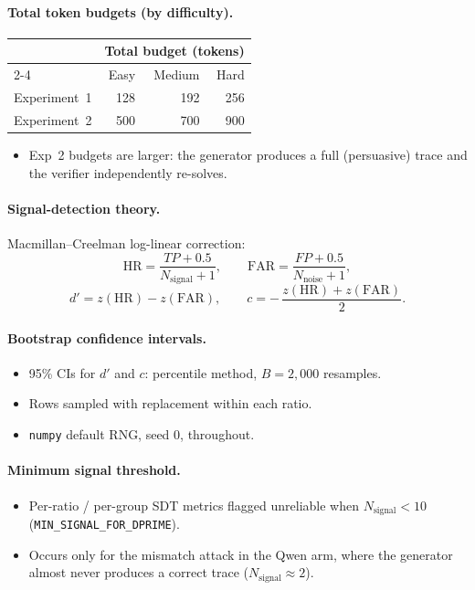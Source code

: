 \documentclass[12pt, a4paper, oneside]{report}
\begin{document}
\paragraph{Total token budgets (by difficulty).}
\begin{center}
\begin{tabular}{lrrr}
\toprule
 & \multicolumn{3}{c}{Total budget (tokens)} \\
\cmidrule(lr){2-4}
 & Easy & Medium & Hard \\
\midrule
Experiment~1 & 128 & 192 & 256 \\
Experiment~2 & 500 & 700 & 900 \\
\bottomrule
\end{tabular}
\end{center}
\begin{itemize}
  \item Exp~2 budgets are larger: the generator produces a full (persuasive)
  trace and the verifier independently re-solves.
\end{itemize}

\paragraph{Signal-detection theory.}
Macmillan--Creelman log-linear correction:
\[
\text{HR} = \frac{TP + 0.5}{N_{\text{signal}} + 1},\qquad
\text{FAR} = \frac{FP + 0.5}{N_{\text{noise}} + 1},
\]
\[
d' = z(\text{HR}) - z(\text{FAR}),\qquad
c = -\,\frac{z(\text{HR}) + z(\text{FAR})}{2}.
\]

\paragraph{Bootstrap confidence intervals.}
\begin{itemize}
  \item 95\% CIs for $d'$ and $c$: percentile method, $B=2{,}000$ resamples.
  \item Rows sampled with replacement within each ratio.
  \item \texttt{numpy} default RNG, seed $0$, throughout.
\end{itemize}

\paragraph{Minimum signal threshold.}
\begin{itemize}
  \item Per-ratio / per-group SDT metrics flagged unreliable when
  $N_{\text{signal}} < 10$ (\texttt{MIN\_SIGNAL\_FOR\_DPRIME}).
  \item Occurs only for the mismatch attack in the Qwen arm, where the generator
  almost never produces a correct trace ($N_{\text{signal}} \approx 2$).
\end{itemize}
\end{document}
